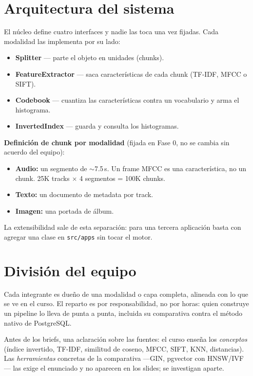 \documentclass[11pt]{article}
\begin{document}
\section{Arquitectura del sistema}

El núcleo define cuatro interfaces y nadie las toca una vez fijadas. Cada modalidad las implementa por su lado:

\begin{itemize}[leftmargin=1.4em, itemsep=0.2em]
  \item \textbf{Splitter} --- parte el objeto en unidades (chunks).
  \item \textbf{FeatureExtractor} --- saca características de cada chunk (TF-IDF, MFCC o SIFT).
  \item \textbf{Codebook} --- cuantiza las características contra un vocabulario y arma el histograma.
  \item \textbf{InvertedIndex} --- guarda y consulta los histogramas.
\end{itemize}

\textbf{Definición de chunk por modalidad} (fijada en Fase 0, no se cambia sin acuerdo del equipo):

\begin{itemize}[leftmargin=1.4em, itemsep=0.2em]
  \item \textbf{Audio:} un segmento de $\sim$7.5\,s. Un frame MFCC es una característica, no un chunk. 25K tracks $\times$ 4 segmentos = 100K chunks.
  \item \textbf{Texto:} un documento de metadata por track.
  \item \textbf{Imagen:} una portada de álbum.
\end{itemize}

La extensibilidad sale de esta separación: para una tercera aplicación basta con agregar una clase en \texttt{src/apps} sin tocar el motor.

\section{División del equipo}

Cada integrante es dueño de una modalidad o capa completa, alineada con lo que se ve en el curso. El reparto es por responsabilidad, no por horas: quien construye un pipeline lo lleva de punta a punta, incluida su comparativa contra el método nativo de PostgreSQL.

Antes de los briefs, una aclaración sobre las fuentes: el curso enseña los \emph{conceptos} (índice invertido, TF-IDF, similitud de coseno, MFCC, SIFT, KNN, distancias). Las \emph{herramientas} concretas de la comparativa ---GIN, pgvector con HNSW/IVF--- las exige el enunciado y no aparecen en los slides; se investigan aparte.
\end{document}
